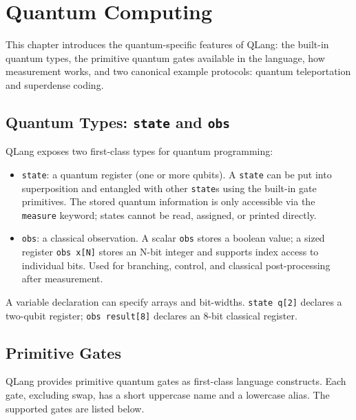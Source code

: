 \section{Quantum Computing}
\label{sec:quantum-computing}

This chapter introduces the quantum-specific features of QLang: the built-in
quantum types, the primitive quantum gates available in the language, how
measurement works, and two canonical example protocols: quantum
teleportation and superdense coding.

\subsection{Quantum Types: \texttt{state} and \texttt{obs}}
\label{sec:quantum-types}

QLang exposes two first-class types for quantum programming:

\begin{itemize}
    \item \texttt{state}: a quantum register (one or more qubits). A
        \texttt{state} can be put into superposition and entangled with other
        \texttt{state}s using the built-in gate primitives. The stored quantum
        information is only accessible via the \texttt{measure} keyword;
        states cannot be read, assigned, or printed directly.
    \item \texttt{obs}: a classical observation. A scalar \texttt{obs} stores
        a boolean value; a sized register \texttt{obs x[N]} stores an N-bit
        integer and supports index access to individual bits. Used for
        branching, control, and classical post-processing after measurement.
\end{itemize}

A variable declaration can specify arrays and bit-widths.
\texttt{state q[2]} declares a two-qubit register;
\texttt{obs result[8]} declares an 8-bit classical register.

\subsection{Primitive Gates}
\label{sec:quantum-gates}

QLang provides primitive quantum gates as first-class language constructs.
Each gate, excluding swap, has a short uppercase name and a lowercase alias.
The supported gates are listed below.

